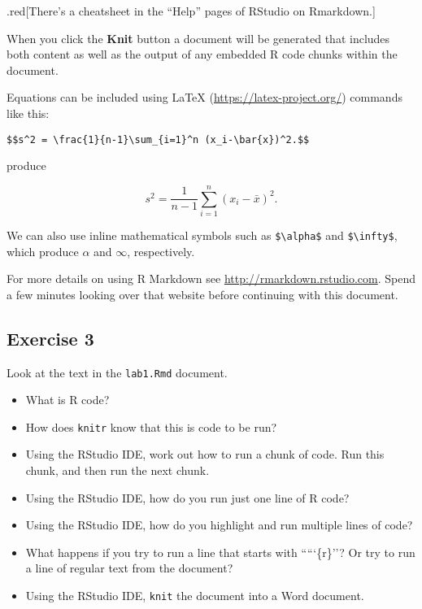 \documentclass[]{article}
\providecommand{\tightlist}{%
  \setlength{\itemsep}{0pt}\setlength{\parskip}{0pt}}
\begin{document}
.red{[}There's a cheatsheet in the ``Help'' pages of RStudio on
Rmarkdown.{]}

When you click the \textbf{Knit} button a document will be generated
that includes both content as well as the output of any embedded R code
chunks within the document.

Equations can be included using LaTeX (\url{https://latex-project.org/})
commands like this:

\begin{verbatim}
$$s^2 = \frac{1}{n-1}\sum_{i=1}^n (x_i-\bar{x})^2.$$
\end{verbatim}

produce

\[s^2 = \frac{1}{n-1}\sum_{i=1}^n (x_i-\bar{x})^2.\]

We can also use inline mathematical symbols such as
\texttt{\$\textbackslash{}alpha\$} and
\texttt{\$\textbackslash{}infty\$}, which produce \(\alpha\) and
\(\infty\), respectively.

For more details on using R Markdown see
\url{http://rmarkdown.rstudio.com}. Spend a few minutes looking over
that website before continuing with this document.

\hypertarget{exercise-3}{%
\subsection{Exercise 3}\label{exercise-3}}

Look at the text in the \texttt{lab1.Rmd} document.

\begin{itemize}
\tightlist
\item
  What is R code?
\item
  How does \texttt{knitr} know that this is code to be run?
\item
  Using the RStudio IDE, work out how to run a chunk of code. Run this
  chunk, and then run the next chunk.
\item
  Using the RStudio IDE, how do you run just one line of R code?
\item
  Using the RStudio IDE, how do you highlight and run multiple lines of
  code?
\item
  What happens if you try to run a line that starts with `````\{r\}''?
  Or try to run a line of regular text from the document?
\item
  Using the RStudio IDE, \texttt{knit} the document into a Word
  document.
\end{itemize}
\end{document}

